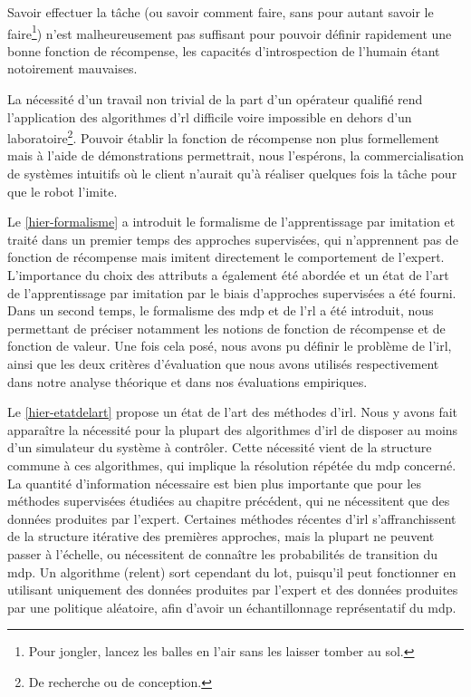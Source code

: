 \documentclass[frenchb,a4paper,justified,notoc]{tufte-book}
\begin{document}
Savoir effectuer la tâche (ou savoir comment faire, sans pour autant savoir le faire\footnote{Pour jongler, lancez les balles en l'air sans les laisser tomber au sol.
 }) n'est malheureusement pas suffisant pour pouvoir définir rapidement une bonne fonction de récompense, les capacités d'introspection de l'humain étant notoirement mauvaises.

La nécessité d'un travail non trivial de la part d'un opérateur qualifié rend l'application des algorithmes d'\gls{rl} difficile voire impossible en dehors d'un laboratoire\footnote{De recherche ou de conception.
 }. Pouvoir établir la fonction de récompense non plus formellement mais à l'aide de démonstrations permettrait, nous l'espérons, la commercialisation de systèmes intuitifs où le client n'aurait qu'à réaliser quelques fois la tâche pour que le robot l'imite.

Le \autoref{hier-formalisme} a introduit le formalisme de l'apprentissage par imitation et traité dans un premier temps des approches supervisées, qui n'apprennent pas de fonction de récompense mais imitent directement le comportement de l'expert. L'importance du choix des attributs a également été abordée et un état de l'art de l'apprentissage par imitation par le biais d'approches supervisées a été fourni. Dans un second temps, le formalisme des \gls{mdp} et de l'\gls{rl} a été introduit, nous permettant de préciser notamment les notions de fonction de récompense et de fonction de valeur. Une fois cela posé, nous avons pu définir le problème de l'\gls{irl}, ainsi que les deux critères d'évaluation que nous avons utilisés respectivement dans notre analyse théorique et dans nos évaluations empiriques.

Le \autoref{hier-etatdelart} propose un état de l'art des méthodes d'\gls{irl}. Nous y avons fait apparaître la nécessité pour la plupart des algorithmes d'\gls{irl} de disposer au moins d'un simulateur du système à contrôler. Cette nécessité vient de la structure commune à ces algorithmes, qui implique la résolution répétée du \gls{mdp} concerné. La quantité d'information nécessaire est bien plus importante que pour les méthodes supervisées étudiées au chapitre précédent, qui ne nécessitent que des données produites par l'expert. Certaines méthodes récentes d'\gls{irl} s'affranchissent de la structure itérative des premières approches, mais la plupart ne peuvent passer à l'échelle, ou nécessitent de connaître les probabilités de transition du \gls{mdp}. Un algorithme (\gls{relent}) sort cependant du lot, puisqu'il peut fonctionner en utilisant uniquement des données produites par l'expert et des données produites par une politique aléatoire, afin d'avoir un échantillonnage représentatif du \gls{mdp}.
\end{document}
